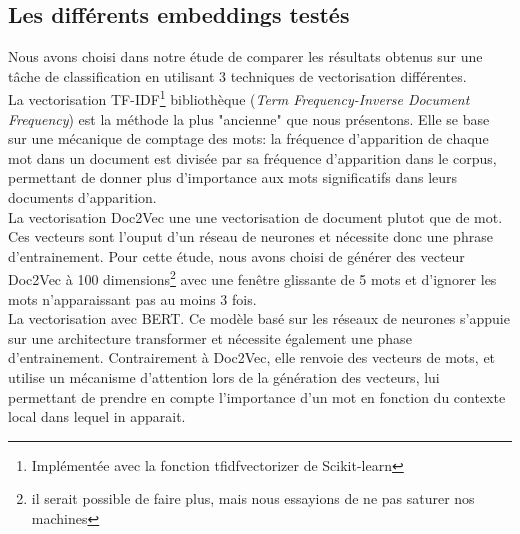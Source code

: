 \subsection{Les différents embeddings testés}
Nous avons choisi dans notre étude de comparer les résultats obtenus sur une tâche 
de classification en utilisant 3 techniques de vectorisation différentes.\\
\indent La vectorisation TF-IDF\footnote{Implémentée avec la fonction tfidfvectorizer de Scikit-learn} bibliothèque (\textit{Term Frequency-Inverse Document Frequency})
est la méthode la plus "ancienne" que nous présentons. Elle se base sur une mécanique de comptage des mots:
la fréquence d'apparition de chaque mot dans un document est divisée par sa fréquence d'apparition dans le corpus,
permettant de donner plus d'importance aux mots significatifs dans leurs documents d'apparition.\\
\indent La vectorisation Doc2Vec une une vectorisation de document plutot que de mot. Ces vecteurs sont
l'ouput d'un réseau de neurones et nécessite donc une phrase d'entrainement. Pour cette étude,
nous avons choisi de générer des vecteur Doc2Vec à 100 dimensions\footnote{il serait possible de faire plus, mais nous essayions de ne pas saturer nos machines}
avec une fenêtre glissante de 5 mots et d'ignorer les mots n'apparaissant pas au moins 3 fois.\\
\indent La vectorisation avec BERT. Ce modèle basé sur les réseaux de neurones s'appuie sur une 
architecture transformer et nécessite également une phase d'entrainement. Contrairement à
Doc2Vec, elle renvoie des vecteurs de mots, et utilise un mécanisme d'attention lors de
la génération des vecteurs, lui permettant de prendre en compte l'importance d'un mot en fonction du contexte local dans
lequel in apparait.





